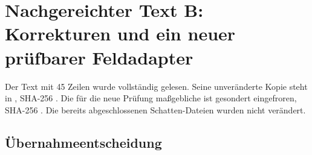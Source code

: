 \section{Nachgereichter Text B: Korrekturen und ein neuer prüfbarer
Feldadapter}\label{nachgereichter-text-b-korrekturen-und-ein-neuer-pruxfcfbarer-feldadapter}

Der Text mit 45 Zeilen wurde vollständig gelesen. Seine unveränderte
Kopie steht in , SHA-256
.
Die für die neue Prüfung maßgebliche  ist
gesondert eingefroren, SHA-256
.
Die bereits abgeschlossenen Schatten-Dateien wurden nicht verändert.

\subsection{Übernahmeentscheidung}\label{uxfcbernahmeentscheidung}

